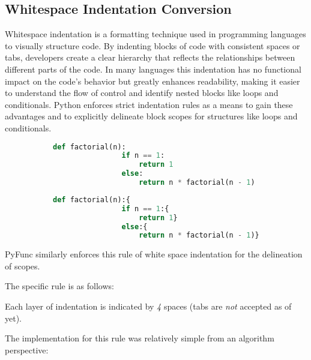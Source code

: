 \documentclass{l4proj}
\begin{document}
\subsection{Whitespace Indentation Conversion}

Whitespace indentation is a formatting technique used in programming languages to visually structure code.
By indenting blocks of code with consistent spaces or tabs, developers create a clear hierarchy that reflects the relationships between different parts of the code.
In many languages this indentation has no functional impact on the code's behavior but greatly enhances readability, making it easier to understand the flow of control and identify nested blocks like loops and conditionals.
Python enforces strict indentation rules as a means to gain these advantages and to explicitly delineate block scopes for structures like loops and conditionals.

\begin{figure}[h]
    \centering
    \begin{subfigure}[b]{0.45\textwidth}
        \begin{lstlisting}[language=Python]
            def factorial(n):
                if n == 1:
                    return 1
                else:
                    return n * factorial(n - 1)
        \end{lstlisting}
    \end{subfigure}
    \begin{subfigure}[b]{0.45\textwidth}
        \begin{lstlisting}[language=Python]
            def factorial(n):{
                if n == 1:{
                    return 1}
                else:{
                    return n * factorial(n - 1)}}
        \end{lstlisting}
    \end{subfigure}
        
\end{figure}

PyFunc similarly enforces this rule of white space indentation for the delineation of scopes.

The specific rule is as follows:

\begin{center}
Each layer of indentation is indicated by \emph{4} spaces (tabs are \emph{not} accepted as of yet).
\end{center}

The implementation for this rule was relatively simple from an algorithm perspective:
\end{document}
